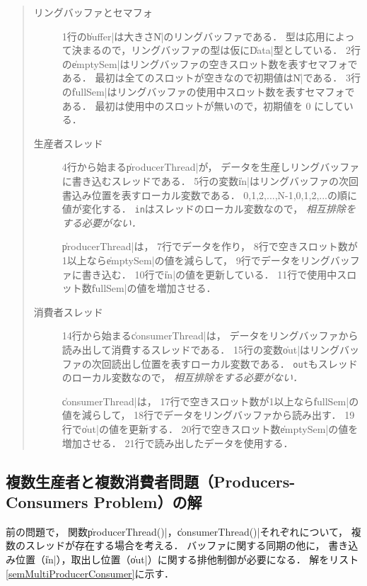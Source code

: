 

\begin{quote}
  \begin{description}
  \item [リングバッファとセマフォ]
    1行の\|buffer|は大きさ\|N|のリングバッファである．
    型は応用によって決まるので，リングバッファの型は仮に\|Data|型としている．
    2行の\|emptySem|はリングバッファの空きスロット数を表すセマフォである．
    最初は全てのスロットが空きなので初期値は\|N|である．
    3行の\|fullSem|はリングバッファの使用中スロット数を表すセマフォである．
    最初は使用中のスロットが無いので，初期値を 0 にしている．

  \item [生産者スレッド]
    4行から始まる\|producerThread|が，
    データを生産しリングバッファに書き込むスレッドである．
    5行の変数\|in|はリングバッファの次回書込み位置を表すローカル変数である．
    0,1,2,...,N-1,0,1,2,...の順に値が変化する．
    \texttt{in}はスレッドのローカル変数なので，
    \emph{相互排除をする必要がない．}

    \|producerThread|は，
    7行でデータを作り，
    8行で空きスロット数が1以上なら\|emptySem|の値を減らして，
    9行でデータをリングバッファに書き込む．
    10行で\|in|の値を更新している．
    11行で使用中スロット数\|fullSem|の値を増加させる．

  \item [消費者スレッド]
    14行から始まる\|consumerThread|は，
    データをリングバッファから読み出して消費するスレッドである．
    15行の変数\|out|はリングバッファの次回読出し位置を表すローカル変数である．
    \texttt{out}もスレッドのローカル変数なので，
    \emph{相互排除をする必要がない．}

    \|consumerThread|は，
    17行で空きスロット数が1以上なら\|fullSem|の値を減らして，
    18行でデータをリングバッファから読み出す．
    19行で\|out|の値を更新する．
    20行で空きスロット数\|emptySem|の値を増加させる．
    21行で読み出したデータを使用する．
  \end{description}
\end{quote}

\subsection{複数生産者と複数消費者問題（Producers-Consumers Problem）の解}
前の問題で，
関数\|producerThread()|，\|consumerThread()|それぞれについて，
複数のスレッドが存在する場合を考える．
バッファに関する同期の他に，
書き込み位置（\|in|），取出し位置（\|out|）に関する排他制御が必要になる．
解をリスト\ref{semMultiProducerConsumer}に示す．

